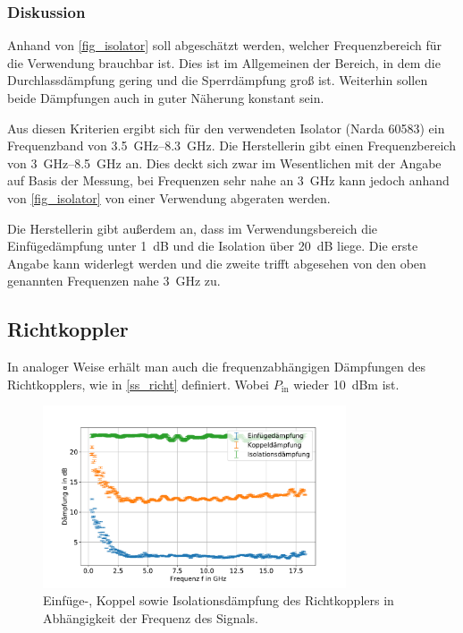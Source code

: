 \documentclass[
	a4paper,
	12pt,
	pagesize,
	ngerman
]{scrartcl}
\begin{document}
	\subsubsection*{Diskussion}

	Anhand von \cref{fig_isolator} soll abgeschätzt werden, welcher Frequenzbereich für die Verwendung brauchbar ist.
	Dies ist im Allgemeinen der Bereich, in dem die Durchlassdämpfung gering und die Sperrdämpfung groß ist.
	Weiterhin sollen beide Dämpfungen auch in guter Näherung konstant sein.

	Aus diesen Kriterien ergibt sich für den verwendeten Isolator (Narda 60583) ein Frequenzband von \SIrange{3,5}{8,3}{\giga \hertz}.
	Die Herstellerin gibt einen Frequenzbereich von \SIrange{3}{8,5}{\giga \hertz} an.
	Dies deckt sich zwar im Wesentlichen mit der Angabe auf Basis der Messung, bei Frequenzen sehr nahe an \SI{3}{\giga \hertz} kann jedoch anhand von \cref{fig_isolator} von einer Verwendung abgeraten werden.

	Die Herstellerin gibt außerdem an, dass im Verwendungsbereich die Einfügedämpfung unter \SI{1}{dB} und die Isolation über \SI{20}{dB} liege.
	Die erste Angabe kann widerlegt werden und die zweite trifft abgesehen von den oben genannten Frequenzen nahe \SI{3}{\giga \hertz} zu.

	\subsection{Richtkoppler}
	In analoger Weise erhält man auch die frequenzabhängigen Dämpfungen des Richtkopplers, wie in \cref{ss_richt} definiert.
	Wobei $P_\text{in}$ wieder \SI{10}{dBm} ist.
	\begin{figure}[H]
		\includegraphics[width=0.8\textwidth]{img/richtkop}
		\centering
		\caption{
		Einfüge-, Koppel sowie Isolationsdämpfung des Richtkopplers in Abhängigkeit der Frequenz des Signals.
		}
		\label{fig_richt}
		\centering
	\end{figure}
\end{document}
